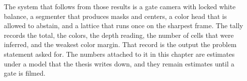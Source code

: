 The system that follows from those results is a gate camera with locked white balance, a segmenter that produces masks and centers, a color head that is allowed to abstain, and a lattice that runs once on the sharpest frame. The tally records the total, the colors, the depth reading, the number of cells that were inferred, and the weakest color margin. That record is the output the problem statement asked for. The numbers attached to it in this chapter are estimates under a model that the thesis writes down, and they remain estimates until a gate is filmed.

\clearpage
